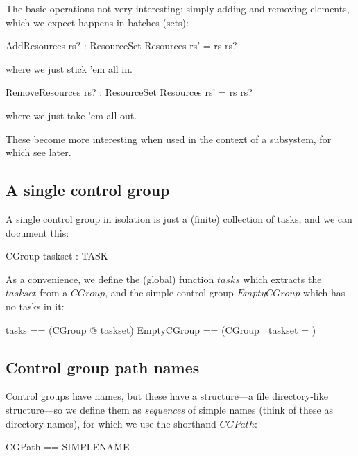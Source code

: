 \documentclass[a4paper,twoside,12pt]{article}
\begin{document}
The basic operations not very interesting: simply adding and removing elements, which we expect happens
in batches (sets):

\begin{schema}{AddResources}
rs? : ResourceSet
\also
\Delta Resources
\where
rs' = rs \cup rs?
\end{schema}
where we just stick 'em all in.

\begin{schema}{RemoveResources}
rs? : ResourceSet
\also
\Delta Resources
\where
rs' = rs \setminus rs?
\end{schema}
where we just take 'em all out.

These become more interesting when used in the context of a subsystem, for which see later.

\subsection{A single control group}

A single control group in isolation is just a (finite) collection of tasks, and we can document this:

\begin{schema}{CGroup}
taskset : \finset TASK
\end{schema}

As a convenience, we define the (global) function $tasks$ which extracts the $taskset$ from a $CGroup$, and the
simple control group $EmptyCGroup$ which has no tasks in it:
\begin{zed}
tasks == (\lambda CGroup @ taskset)
\also
EmptyCGroup == (\mu CGroup | taskset = \emptyset )
\end{zed}

\subsection{Control group path names}

Control groups have names, but these have a structure---a file directory-like structure---so we define them as \emph{sequences} of simple names (think of these as directory names), for which we use the shorthand $CGPath$:

\begin{zed}
CGPath == \seq SIMPLENAME
\end{zed}
\end{document}
